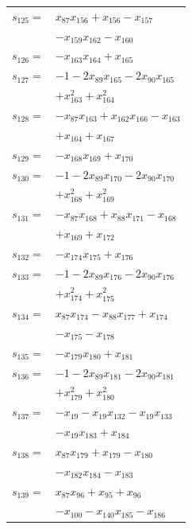 \begin{longtable}{@{}r@{\;}l@{}}
\(s_{125}=\) & \(\displaystyle x_{87}x_{156} +x_{156} -x_{157}\) \\
 & \(\displaystyle -x_{159}x_{162} -x_{160}\) \\[3pt]
\(s_{126}=\) & \(\displaystyle -x_{163}x_{164} +x_{165}\) \\[3pt]
\(s_{127}=\) & \(\displaystyle -1 -2x_{89}x_{165} -2x_{90}x_{165}\) \\
 & \(\displaystyle +x_{163}^{2} +x_{164}^{2}\) \\[3pt]
\(s_{128}=\) & \(\displaystyle -x_{87}x_{163} +x_{162}x_{166} -x_{163}\) \\
 & \(\displaystyle +x_{164} +x_{167}\) \\[3pt]
\(s_{129}=\) & \(\displaystyle -x_{168}x_{169} +x_{170}\) \\[3pt]
\(s_{130}=\) & \(\displaystyle -1 -2x_{89}x_{170} -2x_{90}x_{170}\) \\
 & \(\displaystyle +x_{168}^{2} +x_{169}^{2}\) \\[3pt]
\(s_{131}=\) & \(\displaystyle -x_{87}x_{168} +x_{88}x_{171} -x_{168}\) \\
 & \(\displaystyle +x_{169} +x_{172}\) \\[3pt]
\(s_{132}=\) & \(\displaystyle -x_{174}x_{175} +x_{176}\) \\[3pt]
\(s_{133}=\) & \(\displaystyle -1 -2x_{89}x_{176} -2x_{90}x_{176}\) \\
 & \(\displaystyle +x_{174}^{2} +x_{175}^{2}\) \\[3pt]
\(s_{134}=\) & \(\displaystyle x_{87}x_{174} -x_{88}x_{177} +x_{174}\) \\
 & \(\displaystyle -x_{175} -x_{178}\) \\[3pt]
\(s_{135}=\) & \(\displaystyle -x_{179}x_{180} +x_{181}\) \\[3pt]
\(s_{136}=\) & \(\displaystyle -1 -2x_{89}x_{181} -2x_{90}x_{181}\) \\
 & \(\displaystyle +x_{179}^{2} +x_{180}^{2}\) \\[3pt]
\(s_{137}=\) & \(\displaystyle -x_{19} -x_{19}x_{132} -x_{19}x_{133}\) \\
 & \(\displaystyle -x_{19}x_{183} +x_{184}\) \\[3pt]
\(s_{138}=\) & \(\displaystyle x_{87}x_{179} +x_{179} -x_{180}\) \\
 & \(\displaystyle -x_{182}x_{184} -x_{183}\) \\[3pt]
\(s_{139}=\) & \(\displaystyle x_{87}x_{96} +x_{95} +x_{96}\) \\
 & \(\displaystyle -x_{100} -x_{140}x_{185} -x_{186}\) \\[3pt]

\end{longtable}
